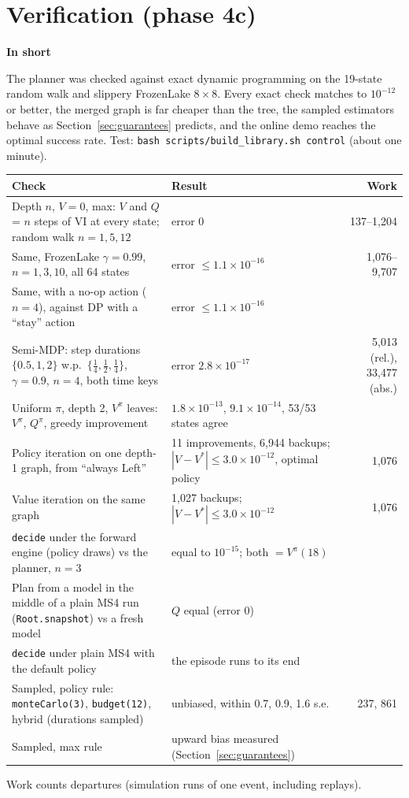 \documentclass[11pt]{article}
\newcommand{\code}[1]{\texttt{#1}}
\newcommand{\shadedbox}[3]{\par\smallskip\noindent\colorbox{#1}{\parbox{\dimexpr\linewidth-2\fboxsep}{\textbf{#2}\par #3}}\par\smallskip}
\newcommand{\takeaway}[1]{\shadedbox{okbg}{In short}{#1}}
\theoremstyle{plain}
\begin{document}
\section{Verification (phase 4c)}\label{sec:verify}

\takeaway{The planner was checked against exact dynamic programming on the 19-state random walk and slippery
FrozenLake $8\times8$. Every exact check matches to $10^{-12}$ or better, the merged graph is far cheaper than the
tree, the sampled estimators behave as Section~\ref{sec:guarantees} predicts, and the online demo reaches the optimal
success rate. Test: \code{bash scripts/build\_library.sh control} (about one minute).}

\begin{center}
\small
\begin{tabularx}{\linewidth}{@{}Y L{4.4cm} r@{}}
\toprule
\textbf{Check} & \textbf{Result} & \textbf{Work}\\
\midrule
Depth $n$, $V=0$, max: $V$ and $Q$ = $n$ steps of VI at every state; random walk $n=1,5,12$ & error 0 & 137--1{,}204\\
Same, FrozenLake $\gamma=0.99$, $n=1,3,10$, all 64 states & error $\le 1.1\times10^{-16}$ & 1{,}076--9{,}707\\
Same, with a no-op action ($n=4$), against DP with a ``stay'' action & error $\le 1.1\times10^{-16}$ & \\
Semi-MDP: step durations $\{0.5,1,2\}$ w.p.\ $\{\tfrac14,\tfrac12,\tfrac14\}$, $\gamma=0.9$, $n=4$, both time keys
  & error $2.8\times10^{-17}$ & 5{,}013 (rel.), 33{,}477 (abs.)\\
Uniform $\pi$, depth 2, $V^\pi$ leaves: $V^\pi$, $Q^\pi$, greedy improvement & $1.8\times10^{-13}$, $9.1\times10^{-14}$,
  53/53 states agree & \\
Policy iteration on one depth-1 graph, from ``always Left'' & 11 improvements, 6{,}944 backups;
  $|V-V^*|\le3.0\times10^{-12}$, optimal policy & 1{,}076\\
Value iteration on the same graph & 1{,}027 backups; $|V-V^*|\le3.0\times10^{-12}$ & 1{,}076\\
\code{decide} under the forward engine (policy draws) vs the planner, $n=3$ & equal to $10^{-15}$; both $=V^\pi(18)$ & \\
Plan from a model in the middle of a plain MS4 run (\code{Root.snapshot}) vs a fresh model & $Q$ equal (error 0) & \\
\code{decide} under plain MS4 with the default policy & the episode runs to its end & \\
Sampled, policy rule: \code{monteCarlo(3)}, \code{budget(12)}, hybrid (durations sampled) & unbiased, within
  0.7, 0.9, 1.6 s.e. & 237, 861\\
Sampled, max rule & upward bias measured (Section~\ref{sec:guarantees}) & \\
\bottomrule
\end{tabularx}
\end{center}
Work counts departures (simulation runs of one event, including replays).
\end{document}
